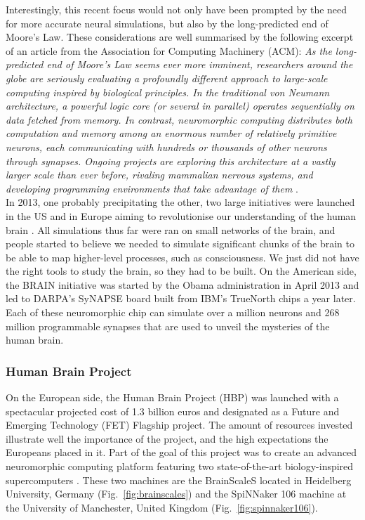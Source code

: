 Interestingly, this recent focus would not only have been prompted by the need for more accurate neural simulations, but also by the long-predicted end of Moore's Law. These considerations are well summarised by the following excerpt of an article from the Association for Computing Machinery (ACM): \textit{As the long-predicted end of Moore's Law seems ever more imminent, researchers around the globe are seriously evaluating a profoundly different approach to large-scale computing inspired by biological principles. In the traditional von Neumann architecture, a powerful logic core (or several in parallel) operates sequentially on data fetched from memory. In contrast, \textit{neuromorphic} computing distributes both computation and memory among an enormous number of relatively primitive \textit{neurons}, each communicating with hundreds or thousands of other neurons through \textit{synapses}. Ongoing projects are exploring this architecture at a vastly larger scale than ever before, rivaling mammalian nervous systems, and developing programming environments that take advantage of them} \cite{acm}. \\

In 2013, one probably precipitating the other, two large initiatives were launched in the US and in Europe aiming to revolutionise our understanding of the human brain \cite{theeco}. All simulations thus far were ran on small networks of the brain, and people started to believe we needed to simulate significant chunks of the brain to be able to map higher-level processes, such as consciousness. We just did not have the right tools to study the brain, so they had to be built. On the American side, the BRAIN initiative was started by the Obama administration in April 2013 \cite{brain} and led to DARPA's SyNAPSE board built from IBM's TrueNorth chips a year later. Each of these neuromorphic chip can simulate over a million neurons and 268 million programmable synapses \cite{truenorth} that are used to unveil the mysteries of the human brain. \\

\subsubsection{Human Brain Project} \label{sec:hbp}

On the European side, the Human Brain Project (HBP) was launched with a spectacular projected cost of 1.3 billion euros and designated as a Future and Emerging Technology (FET) Flagship project. The amount of resources invested illustrate well the importance of the project, and the high expectations the Europeans placed in it. Part of the goal of this project was to create an advanced neuromorphic computing platform featuring two state-of-the-art biology-inspired supercomputers \cite{nmp} \cite{ncp}. These two machines are the BrainScaleS located in Heidelberg University, Germany (Fig.~\ref{fig:brainscales}) and the SpiNNaker 106 machine at the University of Manchester, United Kingdom (Fig.~\ref{fig:spinnaker106}).

